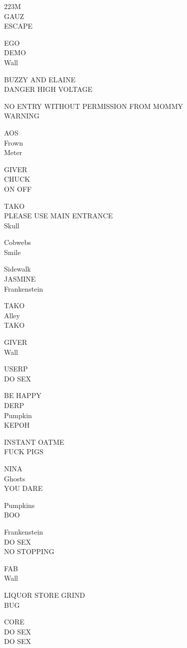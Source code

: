 \documentclass[10pt,letterpaper]{article}
\begin{document}
223M\\
GAUZ\\
ESCAPE

EGO\\
DEMO\\
Wall

BUZZY AND ELAINE\\
DANGER HIGH VOLTAGE

NO ENTRY WITHOUT PERMISSION FROM MOMMY\\
WARNING

AOS\\
Frown\\
Meter

GIVER\\
CHUCK\\
ON OFF

TAKO\\
PLEASE USE MAIN ENTRANCE\\
Skull

Cobwebs\\
Smile

Sidewalk\\
JASMINE\\
Frankenstein

TAKO\\
Alley\\
TAKO

GIVER\\
Wall

USERP\\
DO SEX

BE HAPPY\\
DERP\\
Pumpkin\\
KEPOH

INSTANT OATME\\
FUCK PIGS

NINA\\
Ghosts\\
YOU DARE

Pumpkins\\
BOO

Frankenstein\\
DO SEX\\
NO STOPPING

FAB\\
Wall

LIQUOR STORE GRIND\\
BUG

CORE\\
DO SEX\\
DO SEX
\end{document}
